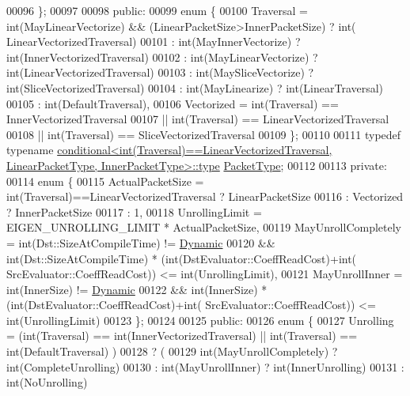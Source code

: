 \begin{DoxyCode}
00096   \};
00097 
00098 \textcolor{keyword}{public}:
00099   \textcolor{keyword}{enum} \{
00100     Traversal = int(MayLinearVectorize) && (LinearPacketSize>InnerPacketSize) ? \textcolor{keywordtype}{int}(
      LinearVectorizedTraversal)
00101               : int(MayInnerVectorize)   ? int(InnerVectorizedTraversal)
00102               : int(MayLinearVectorize)  ? int(LinearVectorizedTraversal)
00103               : int(MaySliceVectorize)   ? int(SliceVectorizedTraversal)
00104               : int(MayLinearize)        ? int(LinearTraversal)
00105                                          : int(DefaultTraversal),
00106     Vectorized = int(Traversal) == InnerVectorizedTraversal
00107               || int(Traversal) == LinearVectorizedTraversal
00108               || int(Traversal) == SliceVectorizedTraversal
00109   \};
00110 
00111   \textcolor{keyword}{typedef} \textcolor{keyword}{typename} 
      \hyperlink{class_eigen_1_1internal_1_1_tensor_lazy_evaluator_writable}{conditional<int(Traversal)==LinearVectorizedTraversal, LinearPacketType, InnerPacketType>::type}
       \hyperlink{class_eigen_1_1internal_1_1_tensor_lazy_evaluator_writable}{PacketType};
00112 
00113 \textcolor{keyword}{private}:
00114   \textcolor{keyword}{enum} \{
00115     ActualPacketSize    = int(Traversal)==LinearVectorizedTraversal ? LinearPacketSize
00116                         : Vectorized ? InnerPacketSize
00117                         : 1,
00118     UnrollingLimit      = EIGEN\_UNROLLING\_LIMIT * ActualPacketSize,
00119     MayUnrollCompletely = int(Dst::SizeAtCompileTime) != \hyperlink{namespace_eigen_ad81fa7195215a0ce30017dfac309f0b2}{Dynamic}
00120                        && int(Dst::SizeAtCompileTime) * (int(DstEvaluator::CoeffReadCost)+int(
      SrcEvaluator::CoeffReadCost)) <= \textcolor{keywordtype}{int}(UnrollingLimit),
00121     MayUnrollInner      = int(InnerSize) != \hyperlink{namespace_eigen_ad81fa7195215a0ce30017dfac309f0b2}{Dynamic}
00122                        && int(InnerSize) * (int(DstEvaluator::CoeffReadCost)+int(
      SrcEvaluator::CoeffReadCost)) <= \textcolor{keywordtype}{int}(UnrollingLimit)
00123   \};
00124 
00125 \textcolor{keyword}{public}:
00126   \textcolor{keyword}{enum} \{
00127     Unrolling = (int(Traversal) == int(InnerVectorizedTraversal) || int(Traversal) == int(DefaultTraversal)
      )
00128                 ? (
00129                     \textcolor{keywordtype}{int}(MayUnrollCompletely) ? int(CompleteUnrolling)
00130                   : int(MayUnrollInner)      ? int(InnerUnrolling)
00131                                              : int(NoUnrolling)

\end{DoxyCode}
